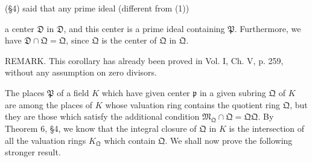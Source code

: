 (§4) said that any prime ideal (different from (1))

a center $\mathfrak{D}$ in $\mathfrak{D}$, and this center is a prime ideal containing $\mathfrak{P}$. Furthermore, we have $\mathfrak{D} \cap \mathfrak{Q} = \mathfrak{Q}$, since $\mathfrak{Q}$ is the center of $\mathfrak{Q}$ in $\mathfrak{Q}$.

REMARK. This corollary has already been proved in Vol. I, Ch. V, p. 259, without any assumption on zero divisors.

The places $\mathfrak{P}$ of a field $K$ which have given center $\mathfrak{p}$ in a given subring $\mathfrak{Q}$ of $K$ are among the places of $K$ whose valuation ring contains the quotient ring $\mathfrak{Q}$, but they are those which satisfy the additional condition $\mathfrak{M}_\mathfrak{Q} \cap \mathfrak{Q} = \mathfrak{Q} \mathfrak{Q}$. By Theorem 6, §4, we know that the integral closure of $\mathfrak{Q}$ in $K$ is the intersection of all the valuation rings $K_\mathfrak{Q}$ which contain $\mathfrak{Q}$. We shall now prove the following stronger result.